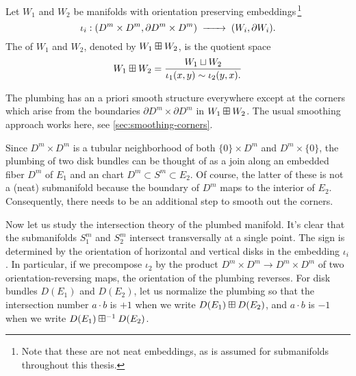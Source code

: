\begin{definition}\label{def:plumbing}
	Let $W_1$ and $W_2$ be manifolds with orientation preserving embeddings\,\footnote{Note that these are not neat embeddings, as is assumed for submanifolds throughout this thesis.}
	\[\iota_i : (D^m\times D^m, \partial D^m\times D^m)\lkxto (W_i, \partial W_i).\]
	The  of $W_1$ and $W_2$, denoted by $W_1\boxplus W_2$, is the quotient space
	\[
		W_1\boxplus W_2 = \frac{W_1\sqcup W_2}{\iota_1(x,y)\sim \iota_2(y,x).}
	\]
\end{definition}

\begin{remark}\label{rmk:smoothing-corners}
	The plumbing has an a priori smooth structure everywhere except at the corners which arise from the boundaries $\partial D^m\times \partial D^m$ in $W_1\boxplus W_2$. The usual smoothing approach works here, see \cref{sec:smoothing-corners}.
\end{remark}

\begin{remark}
	Since $D^m\times D^m$ is a tubular neighborhood of both $\{0\}\times D^m$ and $D^m\times\{0\}$, the plumbing of two disk bundles can be thought of as a join along an embedded fiber $D^m$ of $E_1$ and an chart $D^m\subset S^m\subset E_2$. Of course, the latter of these is not a (neat) submanifold because the boundary of $D^m$ maps to the interior of $E_2$. Consequently, there needs to be an additional step to smooth out the corners.
\end{remark}

Now let us study the intersection theory of the plumbed manifold. It's clear that the submanifolds $S_1^m$ and $S_2^m$ intersect transversally at a single point. The sign is determined by the orientation of horizontal and vertical disks in the embedding $\iota_i$. In particular, if we precompose $\iota_2$ by the product $D^m\times D^m\to D^m\times D^m$ of two orientation-reversing maps, the orientation of the plumbing reverses. For disk bundles $D(E_1)$ and $D(E_2)$, let us normalize the plumbing so that the intersection number $a\cdot b$ is $+1$ when we write $D(E_1)\boxplus D(E_2)$, and $a\cdot b$ is $-1$ when we write $D(E_1)\boxplus^{-1} D(E_2)$.

